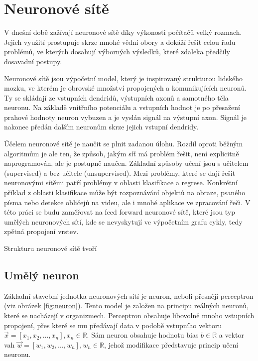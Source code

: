 \chapter{Neuronové sítě}
\label{neuronovky}
V dnešní době zažívají neuronové sítě díky výkonosti počítačů velký rozmach. Jejich využití prostupuje skrze mnohé vědní obory a dokáží řešit celou řadu problémů, ve kterých dosahují výborných výsledků, které zdaleka předčily dosavadní postupy. 

Neuronové sítě jsou výpočetní model, který je inspirovaný strukturou lidského mozku, ve kterém je obrovské množství propojených a komunikujících neuronů. Ty se skládají ze vstupních dendridů, výstupních axonů a samotného těla neuronu. Na základě vnitřního potenciálu a vstupních hodnot je po přesažení prahové hodnoty neuron vybuzen a je vyslán signál na výstupní axon. Signál je nakonec předán dalším neuronům skrze jejich vstupní dendridy\cite[p.~65--66]{mitdeeplearning_small}.

Účelem neuronové sítě je naučit se plnit zadanou úlohu. Rozdíl oproti běžným algoritmům je ale ten, že způsob, jakým síť má problém řešit, není explicitně naprogramován, ale je postupně naučen. Základní způsoby učení jsou s učitelem (supervised) a bez učitele (unsupervised). Mezi problémy, které se dají řešit neuronovými sítěmi patří problémy v oblasti klasifikace a regrese. Konkrétní příklad z oblasti klasifikace může být rozpoznávání objektů na obraze, psaného písma nebo detekce obličejů na videu, ale i mnohé aplikace ve zpracování řeči. V této práci se budu zaměřovat na feed forward neuronové sítě, které jsou typ umělých neuronových sítí, kde se nevyskytují ve výpočetním grafu cykly, tedy zpětná propojení vrstev.

Strukturu neuronové sítě tvoří 

\section{Umělý neuron}
Základní stavební jednotka neuronových sítí je neuron, neboli přesněji perceptron (viz obrázek \ref{fig:neuron}). Tento model je založen na principu reálných neuronů, které se nacházejí v organizmech. Perceptron obsahuje libovolně mnoho vstupních propojení, přes které se mu předávají data v podobě vstupního vektoru $\overrightarrow{x} = [x_1, x_2, \dots, x_n], x_n \in \mathbb{R}$. Sám neuron obsahuje hodnotu bias $b \in \mathbb{R}$ a vektor vah $\overrightarrow{w} = [w_1, w_2, \dots, w_n], w_n \in \mathbb{R}$, jehož modifikace představuje princip učení neuronu.

